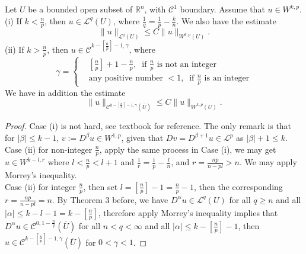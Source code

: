 \documentclass{article}
\begin{document}
\begin{Th}
    Let $U$ be a bounded open subset of $\mathbb{R}^n$, with $\mathscr{C}^1$ boundary. Assume that $u\in W^{k,p}$. \\
    \indent (i) If $k<\frac{n}{p}$, then $u\in\mathscr{L}^{q}(U)$, where $\frac{1}{q}=\frac{1}{p}-\frac{k}{n}$. We also have the estimate 
    $$
    \|u\|_{\mathscr{L}^q(U)}\leq C\|u\|_{W^{k,p}(U)}.
    $$
    \indent (ii) If $k>\frac{n}{p}$, then $u\in\mathscr{C}^{k-[\frac{n}{p}]-1, \gamma}$, where 
    $$
    \gamma = \begin{cases}
  & [\frac{n}{p}]+1-\frac{n}{p}, \ \text{ if } \frac{n}{p} \text{ is not an integer}\\
  & \text{any positive number } < 1,\  \text{ if } \frac{n}{p} \text{ is an integer}
\end{cases}
    $$ We have in addition the estimate 
    $$
    \|u\|_{\mathscr{C}^{k-[\frac{n}{p}]-1, \gamma}(\overline{U})}\leq C\|u\|_{W^{k,p}(U)}.
    $$
\end{Th}

\begin{proof}
    Case (i) is not hard, see textbook for reference. The only remark is that for $|\beta|\leq k-1$, $v:= D^\beta u\in W^{1, p}$, given that $Dv=D^{\beta+1}u\in\mathscr{L}^p$ as $|\beta| + 1\leq k$. \\
    \indent Case (ii) for non-integer $\frac{n}{p}$, apply the same process in Case (i), we may get $u\in W^{k-l, r}$ where $l<\frac{n}{p}<l+1$ and $\frac{1}{r}=\frac{1}{p}-\frac{l}{n}$, and $r=\frac{np}{n-pl}>n$. We may apply Morrey's inequality. \\
    \indent Case (ii) for integer $\frac{n}{p}$, then set $l=\left[\frac{n}{p}\right]-1=\frac{n}{p}-1$, then the corresponding $r=\frac{np}{n-pl}=n$. By Theorem 3 before, we have $D^\alpha u\in\mathscr{L}^{q}(U)$ for all $q\geq n$ and all $|\alpha|\leq k-l-1=k-\left[\frac{n}{p}\right]$, therefore apply Morrey's inequality implies that $D^\alpha u\in\mathscr{C}^{0, 1-\frac{n}{q}}(\overline{U})$ for all $n<q<\infty$ and all $|\alpha|\leq k-\left[\frac{n}{p}\right]-1$, then $u\in\mathscr{C}^{k-\left[\frac{n}{p}\right]-1,\gamma}(\overline{U})$ for $0<\gamma<1$.
\end{proof}
\end{document}
